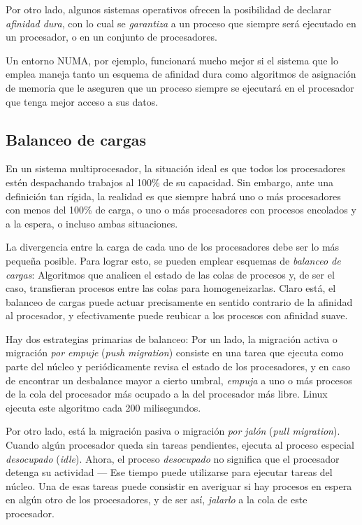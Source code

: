 \documentclass[11pt,fleqn]{book} %
\begin{document}
Por otro lado, algunos sistemas operativos ofrecen la posibilidad de
declarar \emph{afinidad dura}, con lo cual se \emph{garantiza} a un proceso que
siempre será ejecutado en un procesador, o en un conjunto de
procesadores.

Un entorno NUMA, por ejemplo, funcionará mucho mejor si el sistema que
lo emplea maneja tanto un esquema de afinidad dura como algoritmos de
asignación de memoria que le aseguren que un proceso siempre se
ejecutará en el procesador que tenga mejor acceso a sus datos.
\subsection{Balanceo de cargas}
\label{sec-4-4-2}


En un sistema multiprocesador, la situación ideal es que todos los
procesadores estén despachando trabajos al 100\% de su capacidad. Sin
embargo, ante una definición tan rígida, la realidad es que siempre
habrá uno o más procesadores con menos del 100\% de carga, o uno o más
procesadores con procesos encolados y a la espera, o incluso ambas
situaciones.

La divergencia entre la carga de cada uno de los procesadores debe ser
lo más pequeña posible. Para lograr esto, se pueden emplear esquemas de
\emph{balanceo de cargas}: Algoritmos que analicen el estado de las colas
de procesos y, de ser el caso, transfieran procesos entre las colas
para homogeneizarlas. Claro está, el balanceo de cargas puede actuar
precisamente en sentido contrario de la afinidad al procesador, y
efectivamente puede reubicar a los procesos con afinidad suave.

Hay dos estrategias primarias de balanceo: Por un lado, la migración
activa o migración \emph{por empuje} (\emph{push migration}) consiste en una
tarea que ejecuta como parte del núcleo y periódicamente revisa el
estado de los procesadores, y en caso de encontrar un desbalance mayor
a cierto umbral, \emph{empuja} a uno o más procesos de la cola del
procesador más ocupado a la del procesador más libre. Linux ejecuta
este algoritmo cada 200 milisegundos.

Por otro lado, está la migración pasiva o migración \emph{por jalón} (\emph{pull migration}). Cuando algún procesador queda sin tareas pendientes,
ejecuta al proceso especial \emph{desocupado} (\emph{idle}). Ahora, el proceso
\emph{desocupado} no significa que el procesador detenga su actividad — Ese
tiempo puede utilizarse para ejecutar tareas del núcleo. Una de esas
tareas puede consistir en averiguar si hay procesos en espera en algún
otro de los procesadores, y de ser así, \emph{jalarlo} a la cola de este
procesador.
\end{document}
